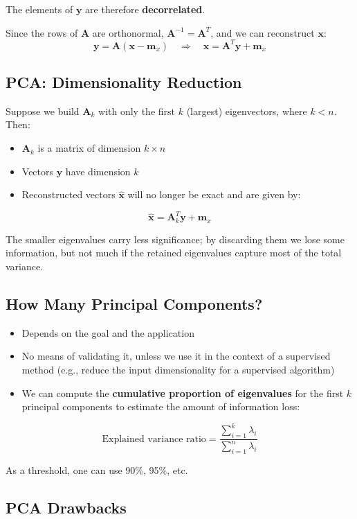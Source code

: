 \documentclass[11pt,a4paper]{article}
\theoremstyle{definition}
\theoremstyle{plain}
\theoremstyle{remark}
\begin{document}
The elements of $\mathbf{y}$ are therefore \textbf{decorrelated}.

Since the rows of $\mathbf{A}$ are orthonormal, $\mathbf{A}^{-1} = \mathbf{A}^T$, and we can reconstruct $\mathbf{x}$:
\[
\mathbf{y} = \mathbf{A}(\mathbf{x} - \mathbf{m}_x) \quad \Rightarrow \quad \mathbf{x} = \mathbf{A}^T \mathbf{y} + \mathbf{m}_x
\]

\subsection{PCA: Dimensionality Reduction}

Suppose we build $\mathbf{A}_k$ with only the first $k$ (largest) eigenvectors, where $k < n$. Then:
\begin{itemize}
    \item $\mathbf{A}_k$ is a matrix of dimension $k \times n$
    \item Vectors $\mathbf{y}$ have dimension $k$
    \item Reconstructed vectors $\hat{\mathbf{x}}$ will no longer be exact and are given by:
\end{itemize}
\[
\hat{\mathbf{x}} = \mathbf{A}_k^T \mathbf{y} + \mathbf{m}_x
\]

The smaller eigenvalues carry less significance; by discarding them we lose some information, but not much if the retained eigenvalues capture most of the total variance.

\subsection{How Many Principal Components?}

\begin{itemize}
    \item Depends on the goal and the application
    \item No means of validating it, unless we use it in the context of a supervised method (e.g., reduce the input dimensionality for a supervised algorithm)
    \item We can compute the \textbf{cumulative proportion of eigenvalues} for the first $k$ principal components to estimate the amount of information loss:
\end{itemize}
\[
\text{Explained variance ratio} = \frac{\sum_{i=1}^{k} \lambda_i}{\sum_{i=1}^{n} \lambda_i}
\]

As a threshold, one can use 90\%, 95\%, etc.

\subsection{PCA Drawbacks}
\end{document}
